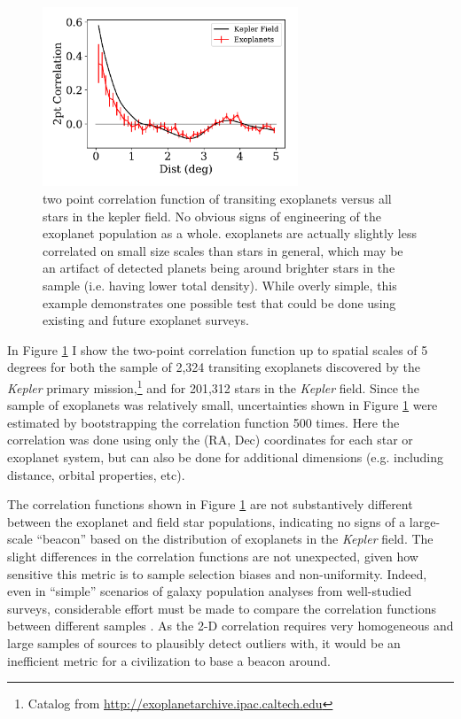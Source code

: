 \documentclass[twocolumn]{aastex62}
\newcommand{\Kepler}{\textsl{Kepler}\xspace}
\begin{document}
\begin{figure}[!t]
\centering
\includegraphics[width=3in]{fig2}
\caption{two point correlation function of transiting exoplanets versus all stars in the kepler field. No obvious signs of engineering of the exoplanet population as a whole. exoplanets are actually slightly less correlated on small size scales than stars in general, which may be an artifact of detected planets being around brighter stars in the sample (i.e. having lower total density). 
While overly simple, this example demonstrates one possible test that could be done using existing and future exoplanet surveys.}
\label{fig:2pt}
\end{figure}



In Figure \ref{fig:2pt} I show the two-point correlation function up to spatial scales of 5 degrees for both the sample of 2,324 transiting exoplanets discovered by the \Kepler primary mission,\footnote{Catalog from \url{http://exoplanetarchive.ipac.caltech.edu}} and for 201,312 stars in the \Kepler field. Since the sample of exoplanets was relatively small, uncertainties shown in Figure \ref{fig:2pt} were estimated by bootstrapping the correlation function 500 times. Here the correlation was done using only the (RA, Dec) coordinates for each star or exoplanet system, but can also be done for additional dimensions (e.g. including distance, orbital properties, etc).


The correlation functions shown in Figure \ref{fig:2pt} are not substantively different between the exoplanet and field star populations, indicating no signs of a large-scale ``beacon'' based on the distribution of exoplanets in the \Kepler field. The slight differences in the correlation functions are not unexpected, given how sensitive this metric is to sample selection biases and non-uniformity. Indeed, even in ``simple'' scenarios of galaxy population analyses from well-studied surveys, considerable effort must be made to compare the correlation functions between different samples \citep[e.g.][]{wang2013}. As the 2-D correlation requires very homogeneous and large samples of sources to plausibly detect outliers with, it would be an inefficient metric for a civilization to base a beacon around. 
\end{document}
